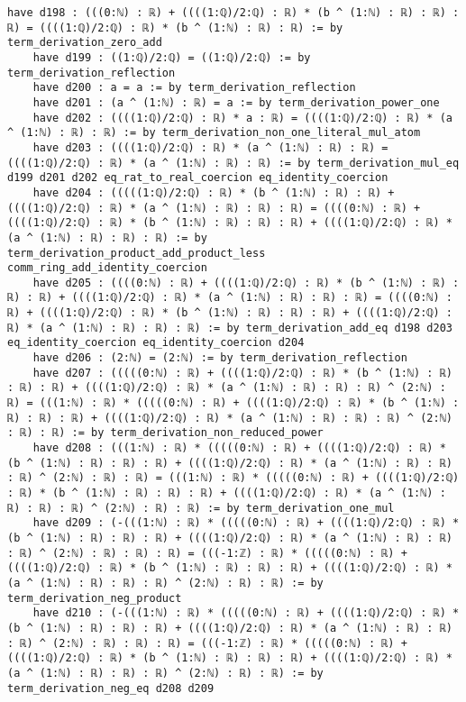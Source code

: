 \documentclass{article}
\begin{document}
\begin{tcolorbox}[colback=white!10, width=\linewidth]
\begin{lstlisting}[language=Lean4]
    have d198 : (((0:ℕ) : ℝ) + ((((1:ℚ)/2:ℚ) : ℝ) * (b ^ (1:ℕ) : ℝ) : ℝ) : ℝ) = ((((1:ℚ)/2:ℚ) : ℝ) * (b ^ (1:ℕ) : ℝ) : ℝ) := by term_derivation_zero_add
    have d199 : ((1:ℚ)/2:ℚ) = ((1:ℚ)/2:ℚ) := by term_derivation_reflection
    have d200 : a = a := by term_derivation_reflection
    have d201 : (a ^ (1:ℕ) : ℝ) = a := by term_derivation_power_one
    have d202 : ((((1:ℚ)/2:ℚ) : ℝ) * a : ℝ) = ((((1:ℚ)/2:ℚ) : ℝ) * (a ^ (1:ℕ) : ℝ) : ℝ) := by term_derivation_non_one_literal_mul_atom
    have d203 : ((((1:ℚ)/2:ℚ) : ℝ) * (a ^ (1:ℕ) : ℝ) : ℝ) = ((((1:ℚ)/2:ℚ) : ℝ) * (a ^ (1:ℕ) : ℝ) : ℝ) := by term_derivation_mul_eq d199 d201 d202 eq_rat_to_real_coercion eq_identity_coercion
    have d204 : (((((1:ℚ)/2:ℚ) : ℝ) * (b ^ (1:ℕ) : ℝ) : ℝ) + ((((1:ℚ)/2:ℚ) : ℝ) * (a ^ (1:ℕ) : ℝ) : ℝ) : ℝ) = ((((0:ℕ) : ℝ) + ((((1:ℚ)/2:ℚ) : ℝ) * (b ^ (1:ℕ) : ℝ) : ℝ) : ℝ) + ((((1:ℚ)/2:ℚ) : ℝ) * (a ^ (1:ℕ) : ℝ) : ℝ) : ℝ) := by term_derivation_product_add_product_less comm_ring_add_identity_coercion
    have d205 : ((((0:ℕ) : ℝ) + ((((1:ℚ)/2:ℚ) : ℝ) * (b ^ (1:ℕ) : ℝ) : ℝ) : ℝ) + ((((1:ℚ)/2:ℚ) : ℝ) * (a ^ (1:ℕ) : ℝ) : ℝ) : ℝ) = ((((0:ℕ) : ℝ) + ((((1:ℚ)/2:ℚ) : ℝ) * (b ^ (1:ℕ) : ℝ) : ℝ) : ℝ) + ((((1:ℚ)/2:ℚ) : ℝ) * (a ^ (1:ℕ) : ℝ) : ℝ) : ℝ) := by term_derivation_add_eq d198 d203 eq_identity_coercion eq_identity_coercion d204
    have d206 : (2:ℕ) = (2:ℕ) := by term_derivation_reflection
    have d207 : (((((0:ℕ) : ℝ) + ((((1:ℚ)/2:ℚ) : ℝ) * (b ^ (1:ℕ) : ℝ) : ℝ) : ℝ) + ((((1:ℚ)/2:ℚ) : ℝ) * (a ^ (1:ℕ) : ℝ) : ℝ) : ℝ) ^ (2:ℕ) : ℝ) = (((1:ℕ) : ℝ) * (((((0:ℕ) : ℝ) + ((((1:ℚ)/2:ℚ) : ℝ) * (b ^ (1:ℕ) : ℝ) : ℝ) : ℝ) + ((((1:ℚ)/2:ℚ) : ℝ) * (a ^ (1:ℕ) : ℝ) : ℝ) : ℝ) ^ (2:ℕ) : ℝ) : ℝ) := by term_derivation_non_reduced_power
    have d208 : (((1:ℕ) : ℝ) * (((((0:ℕ) : ℝ) + ((((1:ℚ)/2:ℚ) : ℝ) * (b ^ (1:ℕ) : ℝ) : ℝ) : ℝ) + ((((1:ℚ)/2:ℚ) : ℝ) * (a ^ (1:ℕ) : ℝ) : ℝ) : ℝ) ^ (2:ℕ) : ℝ) : ℝ) = (((1:ℕ) : ℝ) * (((((0:ℕ) : ℝ) + ((((1:ℚ)/2:ℚ) : ℝ) * (b ^ (1:ℕ) : ℝ) : ℝ) : ℝ) + ((((1:ℚ)/2:ℚ) : ℝ) * (a ^ (1:ℕ) : ℝ) : ℝ) : ℝ) ^ (2:ℕ) : ℝ) : ℝ) := by term_derivation_one_mul
    have d209 : (-(((1:ℕ) : ℝ) * (((((0:ℕ) : ℝ) + ((((1:ℚ)/2:ℚ) : ℝ) * (b ^ (1:ℕ) : ℝ) : ℝ) : ℝ) + ((((1:ℚ)/2:ℚ) : ℝ) * (a ^ (1:ℕ) : ℝ) : ℝ) : ℝ) ^ (2:ℕ) : ℝ) : ℝ) : ℝ) = (((-1:ℤ) : ℝ) * (((((0:ℕ) : ℝ) + ((((1:ℚ)/2:ℚ) : ℝ) * (b ^ (1:ℕ) : ℝ) : ℝ) : ℝ) + ((((1:ℚ)/2:ℚ) : ℝ) * (a ^ (1:ℕ) : ℝ) : ℝ) : ℝ) ^ (2:ℕ) : ℝ) : ℝ) := by term_derivation_neg_product
    have d210 : (-(((1:ℕ) : ℝ) * (((((0:ℕ) : ℝ) + ((((1:ℚ)/2:ℚ) : ℝ) * (b ^ (1:ℕ) : ℝ) : ℝ) : ℝ) + ((((1:ℚ)/2:ℚ) : ℝ) * (a ^ (1:ℕ) : ℝ) : ℝ) : ℝ) ^ (2:ℕ) : ℝ) : ℝ) : ℝ) = (((-1:ℤ) : ℝ) * (((((0:ℕ) : ℝ) + ((((1:ℚ)/2:ℚ) : ℝ) * (b ^ (1:ℕ) : ℝ) : ℝ) : ℝ) + ((((1:ℚ)/2:ℚ) : ℝ) * (a ^ (1:ℕ) : ℝ) : ℝ) : ℝ) ^ (2:ℕ) : ℝ) : ℝ) := by term_derivation_neg_eq d208 d209

\end{lstlisting}
\end{tcolorbox}
\end{document}
